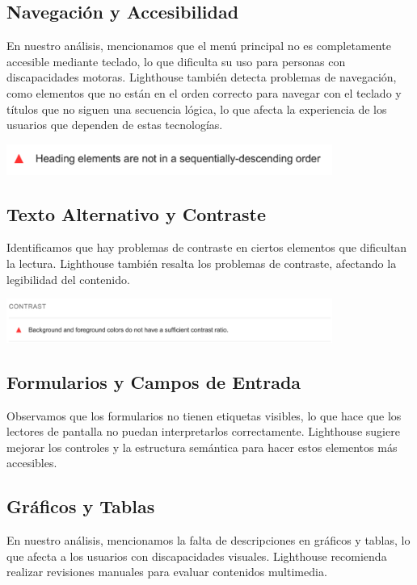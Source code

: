 \documentclass[a4paper,12pt]{article}
\begin{document}
\subsection{Navegación y Accesibilidad}
En nuestro análisis, mencionamos que el menú principal no es completamente accesible mediante teclado, lo que dificulta su uso para personas con discapacidades motoras. Lighthouse también detecta problemas de navegación, como elementos que no están en el orden correcto para navegar con el teclado y títulos que no siguen una secuencia lógica, lo que afecta la experiencia de los usuarios que dependen de estas tecnologías.

\vspace{0.3cm}
\includegraphics[width=0.8\textwidth]{Images/navegacion_accesibilidad.png}

\vspace{-0.2cm}
\subsection{Texto Alternativo y Contraste}
Identificamos que hay problemas de contraste en ciertos elementos que dificultan la lectura. Lighthouse también resalta los problemas de contraste, afectando la legibilidad del contenido.

\vspace{0.3cm}
\includegraphics[width=0.8\textwidth]{Images/texto_contraste.png}

\newpage

\subsection{Formularios y Campos de Entrada}
Observamos que los formularios no tienen etiquetas visibles, lo que hace que los lectores de pantalla no puedan interpretarlos correctamente. Lighthouse sugiere mejorar los controles y la estructura semántica para hacer estos elementos más accesibles.

\subsection{Gráficos y Tablas}
En nuestro análisis, mencionamos la falta de descripciones en gráficos y tablas, lo que afecta a los usuarios con discapacidades visuales. Lighthouse recomienda realizar revisiones manuales para evaluar contenidos multimedia.
\end{document}
